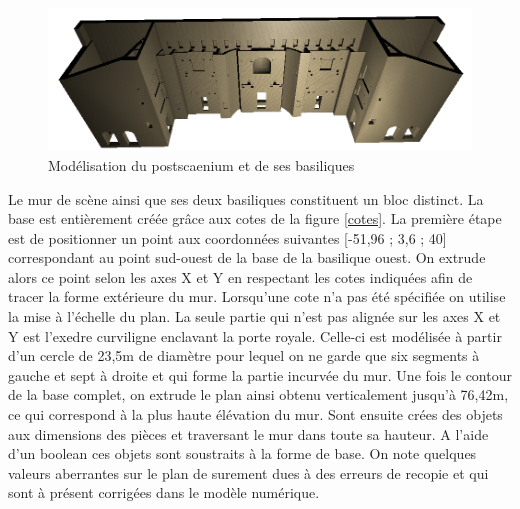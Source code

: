 \begin{figure}[!h]
	\includegraphics[width=\linewidth]{images/modMur}
	\caption{Modélisation du \gls{postscaenium} et de ses \glspl{basilique}} 
	\label{modCavea} 
\end{figure} 

Le mur de scène ainsi que ses deux basiliques constituent un bloc distinct. La base est entièrement créée grâce aux cotes de la figure \ref{cotes}. La première étape est de positionner un point aux coordonnées suivantes [-51,96 ; 3,6 ; 40]  correspondant au point sud-ouest de la base de la basilique ouest. On extrude alors ce point selon les axes X et Y en respectant les cotes indiquées afin de tracer la forme extérieure du mur. Lorsqu'une cote n'a pas été spécifiée on utilise la mise à l'échelle du plan. La seule partie qui n'est pas alignée sur les axes X et Y est l'\gls{exedre} curviligne enclavant la porte royale. Celle-ci est modélisée à partir d'un cercle de 23,5m de diamètre pour lequel on ne garde que six segments à gauche et sept à droite et qui forme la partie incurvée du mur. Une fois le contour de la base complet, on extrude le plan ainsi obtenu verticalement jusqu'à 76,42m, ce qui correspond à la plus haute élévation du mur.
Sont ensuite crées des objets aux dimensions des pièces et traversant le mur dans toute sa hauteur. A l'aide d'un \gls{boolean} ces objets sont soustraits à la forme de base. On note quelques valeurs aberrantes sur le plan de \cite[Pl. XXI]{orangePl} surement dues à des erreurs de recopie et qui sont à présent corrigées dans le modèle numérique. 

